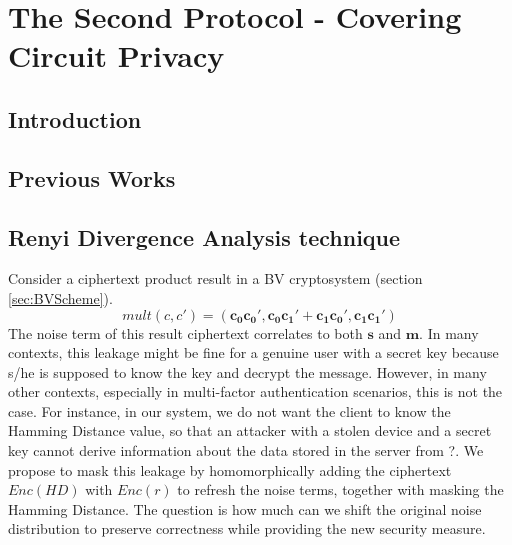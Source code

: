 \chapter{The Second Protocol - Covering Circuit Privacy}
\label{chap:renyiDivergence}

\ifpdf
    \graphicspath{{Chapter4/Figs/Raster/}{Chapter4/Figs/PDF/}{Chapter4/Figs/}}
\else
    \graphicspath{{Chapter4/Figs/Vector/}{Chapter4/Figs/}}
\fi

\section{Introduction}
\label{sec:secProcIntro}

\section{Previous Works}
\label{sec:secProcPrevious}

\section{Renyi Divergence Analysis technique}
\label{sec:secProcRenyi}
Consider a ciphertext product result  in a BV cryptosystem (section \ref{sec:BVScheme}).
\[
mult(c,c') = (\mathbf{c_0}\mathbf{c_0'}, \mathbf{c_0}\mathbf{c_1'} + \mathbf{c_1}\mathbf{c_0'}, \mathbf{c_1}\mathbf{c_1'})
\]
The noise term of this result ciphertext correlates to both $\mathbf{s}$ and $\mathbf{m}$.
In many contexts, this leakage might be fine for a genuine user with a secret key because s/he is supposed to know the key and decrypt the message.
However, in many other contexts, especially in multi-factor authentication
scenarios, this is not the case. For instance, in our system, we do not want the
client to know the Hamming Distance value, so that an attacker with a stolen
device and a secret key cannot derive information about the data stored in the
server from ?. We propose to mask this leakage by homomorphically adding the ciphertext
$Enc(HD)$ with $Enc(r)$ to refresh the noise terms, together with masking the Hamming Distance. The question is how much can
we shift the original noise distribution to preserve correctness while providing
the new security measure.

